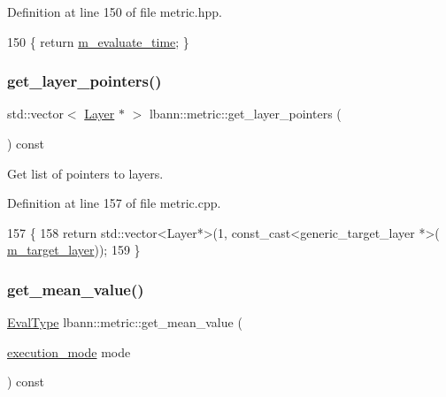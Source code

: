 Definition at line 150 of file metric.\+hpp.


\begin{DoxyCode}
150 \{ \textcolor{keywordflow}{return} \hyperlink{classlbann_1_1metric_a4c77a1bd1db77e9d837a72128e3d687f}{m\_evaluate\_time}; \}
\end{DoxyCode}
\mbox{\label{classlbann_1_1metric_a7f97c998fa64475f9ef7f066237b0695}} 
\subsubsection{\texorpdfstring{get\+\_\+layer\+\_\+pointers()}{get\_layer\_pointers()}}
{\footnotesize\ttfamily std\+::vector$<$ \hyperlink{classlbann_1_1Layer}{Layer} $\ast$ $>$ lbann\+::metric\+::get\+\_\+layer\+\_\+pointers (\begin{DoxyParamCaption}{ }\end{DoxyParamCaption}) const}

Get list of pointers to layers. 

Definition at line 157 of file metric.\+cpp.


\begin{DoxyCode}
157                                                    \{
158   \textcolor{keywordflow}{return} std::vector<Layer*>(1, \textcolor{keyword}{const\_cast<}generic\_target\_layer *\textcolor{keyword}{>}(
      \hyperlink{classlbann_1_1metric_a2bf6c53efb1b525bfa63a8c3167968d9}{m\_target\_layer}));
159 \}
\end{DoxyCode}
\mbox{\label{classlbann_1_1metric_a2926c6b391dc8c3e3d13d0199317c570}} 
\subsubsection{\texorpdfstring{get\+\_\+mean\+\_\+value()}{get\_mean\_value()}}
{\footnotesize\ttfamily \hyperlink{base_8hpp_a3266f5ac18504bbadea983c109566867}{Eval\+Type} lbann\+::metric\+::get\+\_\+mean\+\_\+value (\begin{DoxyParamCaption}\item[{\hyperlink{base_8hpp_a2781a159088df64ed7d47cc91c4dc0a8}{execution\+\_\+mode}}]{mode }\end{DoxyParamCaption}) const}

